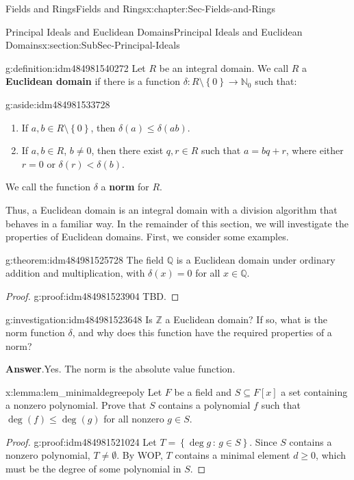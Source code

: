 \documentclass[oneside,10pt,]{book}
\newcommand{\blocktitlefont}{\relax}
\newcommand{\terminology}[1]{\textbf{#1}}
\numberwithin{equation}{section}
\renewcommand{\le}{\leqslant}
\renewcommand{\ge}{\geqslant}
\newcommand{\set}[1]{\left\{ {#1} \right\}}
\newcommand{\setof}[2]{{\left\{#1\,\colon\,#2\right\}}}
\def\Z{{\mathbb Z}}
\def\Q{{\mathbb Q}}
\def\N{{\mathbb N}}
\newcommand{\lt}{<}
\begin{document}
\begin{chapterptx}{Fields and Rings}{}{Fields and Rings}{}{}{x:chapter:Sec-Fields-and-Rings}
\begin{sectionptx}{Principal Ideals and Euclidean Domains}{}{Principal Ideals and Euclidean Domains}{}{}{x:section:SubSec-Principal-Ideals}
\begin{definition}{}{g:definition:idm484981540272}%
Let \(R\) be an integral domain. We call \(R\) a \terminology{Euclidean domain} if there is a function \(\delta : R\setminus \set{0} \to \N_0\) such that: \begin{aside}{}{g:aside:idm484981533728}%
\end{aside}
%
\begin{enumerate}
\item{}If \(a,b\in R\setminus \set{0}\), then \(\delta(a) \le \delta(ab)\).%
\item{}If \(a,b\in R\), \(b\ne 0\), then there exist \(q,r\in R\) such that \(a = bq+r\), where either \(r = 0\) or \(\delta(r) \lt \delta(b)\).%
\end{enumerate}
%
\par
We call the function \(\delta\) a \terminology{norm} for \(R\).%
\end{definition}
Thus, a Euclidean domain is an integral domain with a division algorithm that behaves in a familiar way. In the remainder of this section, we will investigate the properties of Euclidean domains. First, we consider some examples.%
\begin{theorem}{}{}{g:theorem:idm484981525728}%
The field \(\Q\) is a Euclidean domain under ordinary addition and multiplication, with \(\delta(x) = 0\) for all \(x\in \Q\).%
\end{theorem}
\begin{proof}{}{g:proof:idm484981523904}
TBD.\end{proof}
\begin{investigation}{}{g:investigation:idm484981523648}%
Is \(\Z\) a Euclidean domain? If so, what is the norm function \(\delta\), and why does this function have the required properties of a norm?%
\par\smallskip%
\noindent\textbf{\blocktitlefont Answer}.\hypertarget{g:answer:idm484981522192}{}\quad{}Yes. The norm is the absolute value function.%
\end{investigation}
\begin{lemma}{}{}{x:lemma:lem_minimaldegreepoly}%
Let \(F\) be a field and \(S\subseteq F[x]\) a set containing a nonzero polynomial. Prove that \(S\) contains a polynomial \(f\) such that \(\deg(f) \le \deg(g)\) for all nonzero \(g\in S\).%
\end{lemma}
\begin{proof}{}{g:proof:idm484981521024}
Let \(T = \setof{\deg g}{g\in S}\). Since \(S\) contains a nonzero polynomial, \(T\ne \emptyset\). By WOP, \(T\) contains a minimal element \(d \ge 0\), which must be the degree of some polynomial in \(S\).%

\end{proof}
\end{sectionptx}
\end{chapterptx}
\end{document}
